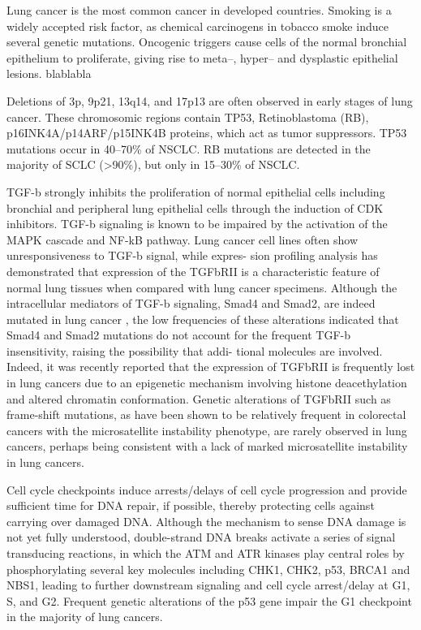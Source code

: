         Lung cancer is the most common cancer in developed countries. Smoking
        is a widely accepted risk factor, as chemical carcinogens in tobacco
        smoke induce several genetic mutations. Oncogenic triggers cause cells
        of the normal bronchial epithelium to proliferate, giving rise to
        meta--, hyper-- and dysplastic epithelial lesions. blablabla

        Deletions of 3p, 9p21, 13q14, and 17p13 are often observed in early
        stages of lung cancer. These chromosomic regions contain TP53,
        Retinoblastoma (RB), p16INK4A/p14ARF/p15INK4B proteins, which act as tumor
        suppressors. TP53 mutations occur in 40--70\% of NSCLC. RB mutations
        are detected in the majority of SCLC (>90\%), but only in 15--30\% of
        NSCLC.

        TGF-b strongly inhibits the proliferation of normal epithelial cells
        including bronchial and peripheral lung epithelial cells through the
        induction of CDK inhibitors. TGF-b signaling is known to be impaired by
        the activation of the MAPK cascade and NF-kB pathway. Lung cancer cell
        lines often show unresponsiveness to TGF-b signal, while expres- sion
        profiling analysis has demonstrated that expression of the TGFbRII is a
        characteristic feature of normal lung tissues when compared with lung
        cancer specimens. Although the intracellular mediators of TGF-b
        signaling, Smad4 and Smad2, are indeed mutated in lung cancer , the low
        frequencies of these alterations indicated that Smad4 and Smad2
        mutations do not account for the frequent TGF-b insensitivity, raising
        the possibility that addi- tional molecules are involved. Indeed, it was
        recently reported that the expression of TGFbRII is frequently lost in
        lung cancers due to an epigenetic mechanism involving histone
        deacethylation and altered chromatin conformation. Genetic alterations
        of TGFbRII such as frame-shift mutations, as have been shown to be
        relatively frequent in colorectal cancers with the microsatellite
        instability phenotype, are rarely observed in lung cancers, perhaps
        being consistent with a lack of marked microsatellite instability in
        lung cancers.

        Cell cycle checkpoints induce arrests/delays of cell cycle progression
        and provide sufficient time for DNA repair, if possible, thereby
        protecting cells against carrying over damaged DNA. Although the
        mechanism to sense DNA damage is not yet fully understood, double-strand
        DNA breaks activate a series of signal transducing reactions, in which
        the ATM and ATR kinases play central roles by phosphorylating several
        key molecules including CHK1, CHK2, p53, BRCA1 and NBS1, leading to
        further downstream signaling and cell cycle arrest/delay at G1, S, and
        G2. Frequent genetic alterations of the p53 gene impair the G1
        checkpoint in the majority of lung cancers.

